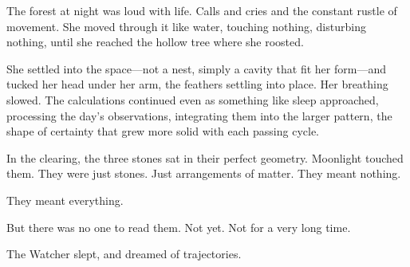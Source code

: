 The forest at night was loud with life. Calls and cries and the constant rustle of movement. She moved through it like water, touching nothing, disturbing nothing, until she reached the hollow tree where she roosted.

She settled into the space—not a nest, simply a cavity that fit her form—and tucked her head under her arm, the feathers settling into place. Her breathing slowed. The calculations continued even as something like sleep approached, processing the day's observations, integrating them into the larger pattern, the shape of certainty that grew more solid with each passing cycle.

In the clearing, the three stones sat in their perfect geometry. Moonlight touched them. They were just stones. Just arrangements of matter. They meant nothing.

They meant everything.

But there was no one to read them. Not yet. Not for a very long time.

The Watcher slept, and dreamed of trajectories.

